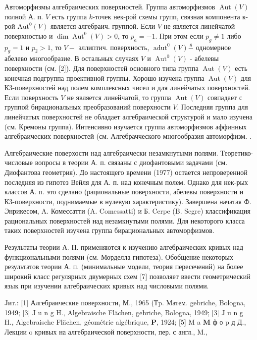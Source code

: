 \documentclass[10pt]{article}
\begin{document}
Автоморфизмы алгебраических поверхностей. Группа автоморфизмов $\operatorname{Aut}(V)$ полной А. п. $V$ есть группа $k$-точек нек-рой схемы групп, связная компонента к-рой $\mathrm{Aut}^{0}(V)$ является алгебраич. группой. Если $V$ не является линейчатой поверхностью и $\operatorname{dim} \operatorname{Aut}^{0}(V)>0$, то $p_{a}=-1$. При этом если $p_{g} \neq 1$ либо $p_{g}=1$ и $p_{2}>1$, то $V-$ эллиптич. поверхность, $\operatorname{adut}^{0}(V) \stackrel{g}{-}$ одномерное абелево многообразие. В остальных случаях $V$ и $\operatorname{Aut}^{0}(V)$ - абелевы поверхности (см. [2]). Для поверхностей основного типа группа $\operatorname{Aut}(V)$ есть конечная подгруппа проективной группы. Хорошо изучена группа $\operatorname{Aut}(V)$ для К3-поверхностей над полем комплексных чисел и для линейчатых поверхностей. Если поверхность $V$ не является линейчатой, то группа $\operatorname{Aut}(V)$ совпадает с группой бирациональных преобразований поверхности $V$. Последняя группа для линейчатых поверхностей не обладает алгебраической структурой и мало изучена (см. Кремоны группа). Интенсивно изучается группа автоморфизмов аффинных алгебраических поверхностей (см. Алгебрачческого многообразия автоморфизм. .



Алгебраические поверхости над алгебраически незамкнутыми полями. Теоретико-числовые вопросы в теории А. п. связаны с диофантовыми задачами (см. Диофантова геометрия). До настоящего времени (1977) остается непроверенной последняя из гипотез Вейля для А. п. над конечным полем. Однако для нек-рых классов А. п. это сделано (рациональные поверхности, абелевы поверхности и К3-поверхности, поднимаемые в нулевую характеристику). Завершена начатая Ф. Энрикесом, A. Комессатти (A. Comessatti) и Б. Cerpe (B. Segre) классификация рациональных поверхностей над незамкнутыми полями. Для некоторого класса таких поверхностей изучена группа бирациональных автоморфизмов.



Результаты теории А. П. применяются к изучению алгебраических кривых над функциональными полями (см. Морделла гипотеза). Обобщение некоторых результатов теории А. п. (минимальные модели, теория пересечений) на более широкий класс регулярных двумерных схем [7] позволяет ввести геометрический язык при изучении алгебраических кривых над числовыми полями.



Jит.: [1] Алгебраические поверхности, М., 1965 (Тp. Матем. gebriche, Bologna, 1949; [3] J u n g H., Algebraische Flächen, gebriche, Bologna, 1949; [3] J u n g H., Algebraische Flächen, géométrie algébrique, $\mathbf{P}$, 1924; [5] M a $\mathbf{M}$ ф о $\mathrm{p}$ д Д., Лекции o кривых на алгебраической поверхности, пер. с англ., M.,
\end{document}

